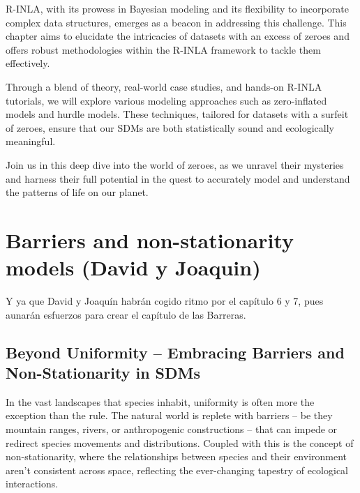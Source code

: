 \documentclass[
]{krantz}
\begin{document}
R-INLA, with its prowess in Bayesian modeling and its flexibility to incorporate complex data structures, emerges as a beacon in addressing this challenge. This chapter aims to elucidate the intricacies of datasets with an excess of zeroes and offers robust methodologies within the R-INLA framework to tackle them effectively.

Through a blend of theory, real-world case studies, and hands-on R-INLA tutorials, we will explore various modeling approaches such as zero-inflated models and hurdle models. These techniques, tailored for datasets with a surfeit of zeroes, ensure that our SDMs are both statistically sound and ecologically meaningful.

Join us in this deep dive into the world of zeroes, as we unravel their mysteries and harness their full potential in the quest to accurately model and understand the patterns of life on our planet.

\pagebreak
\setcounter{chapter}{8}
\setcounter{section}{0}
\renewcommand{\thepage}{\arabic{page}}

\hypertarget{barriers-and-non-stationarity-models-david-y-joaquin}{%
\chapter{Barriers and non-stationarity models (David y Joaquin)}\label{barriers-and-non-stationarity-models-david-y-joaquin}}

Y ya que David y Joaquín habrán cogido ritmo por el capítulo 6 y 7, pues aunarán esfuerzos para crear el capítulo de las Barreras.

\hypertarget{beyond-uniformity-embracing-barriers-and-non-stationarity-in-sdms}{%
\section{Beyond Uniformity -- Embracing Barriers and Non-Stationarity in SDMs}\label{beyond-uniformity-embracing-barriers-and-non-stationarity-in-sdms}}

In the vast landscapes that species inhabit, uniformity is often more the exception than the rule. The natural world is replete with barriers -- be they mountain ranges, rivers, or anthropogenic constructions -- that can impede or redirect species movements and distributions. Coupled with this is the concept of non-stationarity, where the relationships between species and their environment aren't consistent across space, reflecting the ever-changing tapestry of ecological interactions.
\end{document}
